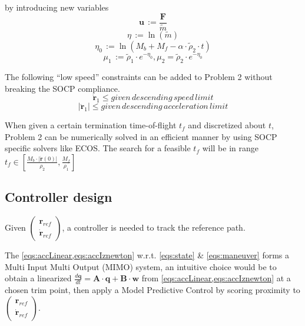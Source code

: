 \documentclass[notitlepage,twocolumn,10pt]{article}
\begin{document}
by introducing new variables
\begin{equation*} \label{eqs:slacku}
\mathbf{u} \, := \frac{\mathbf{F}}{\tilde{m}}
\end{equation*}
\begin{equation*} \label{eqs:slacketa}
\eta \, := \ln(\tilde{m})
\end{equation*}
\begin{equation*} \label{eqs:eta0}
\eta_0 \, := \ln(M_b + M_f - \alpha \cdot \tilde{\rho}_2 \cdot t)
\end{equation*}
\begin{equation*} \label{eqs:mu}
\mu_1 \, := \tilde{\rho}_1 \cdot e^{-\eta_0}, \mu_2 = \tilde{\rho}_2 \cdot e^{-\eta_0}
\end{equation*}

The following ``low speed'' constraints can be added to Problem 2 without breaking the SOCP compliance.  
\begin{equation} 
\dot{\mathbf{r}}_1 \le given \, descending \, speed \, limit
\end{equation}
\begin{equation} 
|\ddot{\mathbf{r}}_1| \le given \, descending \, acceleration \, limit
\end{equation}

When given a certain termination time-of-flight $t_f$ and discretized about $t$, Problem 2 can be numerically solved in an efficient manner by using SOCP specific solvers like ECOS\cite{domahidi2013ecos}. The search for a feasible $t_f$ will be in range $t_f \in [\frac{M_b \cdot |\dot{\mathbf{r}}(0)|}{\rho_2}, \frac{M_f}{\rho_1}]$

\subsection{Controller design}

Given $\begin{pmatrix} \mathbf{r}_{ref} \\ \dot{\mathbf{r}}_{ref} \end{pmatrix}$, a controller is needed to track the reference path. 

The \cref{eqs:accLinear,eqs:accIznewton} w.r.t. \cref{eqs:state} \& \cref{eqs:maneuver} forms a Multi Input Multi Output (MIMO) system, an intuitive choice would be to obtain a linearized $\frac{d\mathbf{q}}{dt} = \mathbf{A} \cdot \mathbf{q} + \mathbf{B} \cdot \mathbf{w}$ from \cref{eqs:accLinear,eqs:accIznewton} at a chosen trim point, then apply a Model Predictive Control by scoring proximity to $\begin{pmatrix} \mathbf{r}_{ref} \\ \dot{\mathbf{r}}_{ref} \end{pmatrix}$. 
\end{document}
